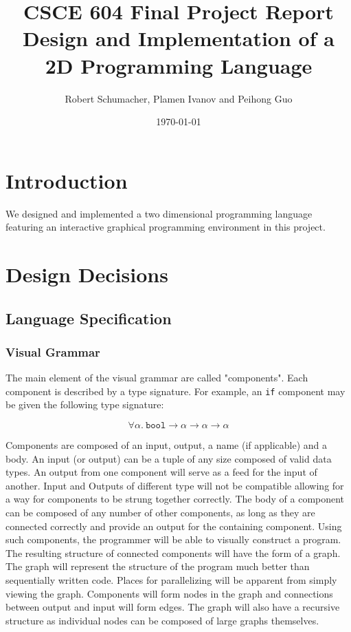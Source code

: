 \documentclass[12pt,UTF8,a4]{article}
\title{CSCE 604 Final Project Report \\ Design and Implementation of a 2D Programming Language}
\author{Robert Schumacher, Plamen Ivanov and Peihong Guo}
\date{\today}
\newcommand{\code}[1]{\texttt{#1}}
\newcommand{\type}[1]{\texttt{#1}}
\begin{document}
\maketitle
\singlespacing

\tableofcontents

\section{Introduction}
We designed and implemented a two dimensional programming language featuring an interactive graphical programming environment in this project.

\section{Design Decisions}
\subsection{Language Specification}
\subsubsection{Visual Grammar}
The main element of the visual grammar are called "components". Each
component is described by a type signature. For example, an \code{if}
component may be given the following type signature:

\[ \forall \alpha.\ \type{bool} \rightarrow \alpha \rightarrow \alpha \rightarrow \alpha \]

Components are composed of an input, output, a name (if applicable)
and a body.  An input (or output) can be a tuple of any size composed
of valid data types. An output from one component will serve as a feed
for the input of another. Input and Outputs of different type will not
be compatible allowing for a way for components to be strung together
correctly.  The body of a component can be composed of any number of
other components, as long as they are connected correctly and provide
an output for the containing component. Using such components, the
programmer will be able to visually construct a program. The resulting
structure of connected components will have the form of a graph. The
graph will represent the structure of the program much better than
sequentially written code.  Places for parallelizing will be apparent
from simply viewing the graph. Components will form nodes in the graph
and connections between output and input will form edges. The graph
will also have a recursive structure as individual nodes can be
composed of large graphs themselves.
\end{document}
